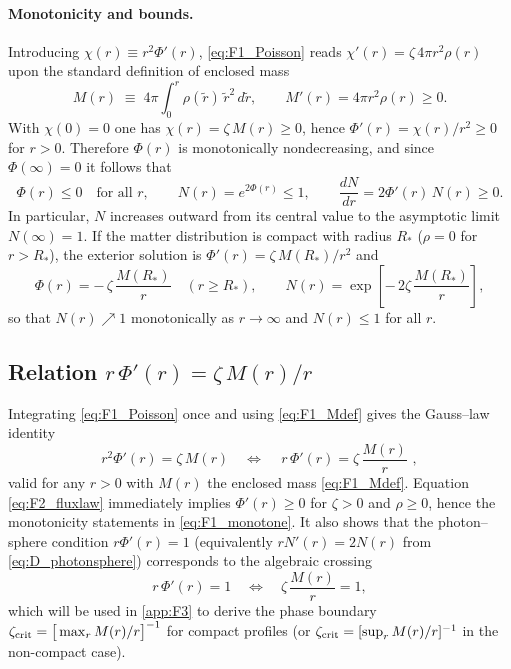 \documentclass{iopjournal}
\begin{document}
\paragraph{Monotonicity and bounds.}
Introducing $\chi(r)\equiv r^{2}\Phi'(r)$, \eqref{eq:F1_Poisson} reads $\chi'(r)=\zeta\,4\pi r^{2}\rho(r)$ upon the standard definition of enclosed mass
\begin{equation}
M(r)\;\equiv\;4\pi\!\int_{0}^{r}\!\rho(\tilde r)\,\tilde r^{2}\,d\tilde r,\qquad M'(r)=4\pi r^{2}\rho(r)\ge0.
\label{eq:F1_Mdef}
\end{equation}
With $\chi(0)=0$ one has $\chi(r)=\zeta\,M(r)\ge0$, hence $\Phi'(r)=\chi(r)/r^{2}\ge0$ for $r>0$. Therefore $\Phi(r)$ is monotonically nondecreasing, and since $\Phi(\infty)=0$ it follows that
\begin{equation}
\Phi(r)\le 0\quad\text{for all }r,\qquad
N(r)=e^{2\Phi(r)}\le 1,\qquad \frac{dN}{dr}=2\Phi'(r)\,N(r)\ge0.
\label{eq:F1_monotone}
\end{equation}
In particular, $N$ increases outward from its central value to the asymptotic limit $N(\infty)=1$. If the matter distribution is compact with radius $R_\ast$ ($\rho=0$ for $r>R_\ast$), the exterior solution is $\Phi'(r)=\zeta\,M(R_\ast)/r^{2}$ and
\begin{equation}
\Phi(r)=-\,\zeta\,\frac{M(R_\ast)}{r}\quad (r\ge R_\ast),\qquad
N(r)=\exp\!\left[-\,2\zeta\,\frac{M(R_\ast)}{r}\right],
\label{eq:F1_ext}
\end{equation}
so that $N(r)\nearrow 1$ monotonically as $r\to\infty$ and $N(r)\le1$ for all $r$.

\subsection{\texorpdfstring{Relation $r\,\Phi'(r)=\zeta\,M(r)/r$}{Relation rΦ′(r)=ζ M(r)/r}}\label{app:F2}

Integrating \eqref{eq:F1_Poisson} once and using \eqref{eq:F1_Mdef} gives the Gauss–law identity
\begin{equation}
r^{2}\Phi'(r)=\zeta\,M(r)\quad\Longleftrightarrow\quad
\boxed{\,r\,\Phi'(r)=\zeta\,\frac{M(r)}{r}\,}\,,
\label{eq:F2_fluxlaw}
\end{equation}
valid for any $r>0$ with $M(r)$ the enclosed mass \eqref{eq:F1_Mdef}. Equation \eqref{eq:F2_fluxlaw} immediately implies $\Phi'(r)\ge0$ for $\zeta>0$ and $\rho\ge0$, hence the monotonicity statements in \eqref{eq:F1_monotone}. It also shows that the photon–sphere condition $r\Phi'(r)=1$ (equivalently $rN'(r)=2N(r)$ from \eqref{eq:D_photonsphere}) corresponds to the algebraic crossing
\begin{equation}
r\,\Phi'(r)=1
\quad\Longleftrightarrow\quad
\zeta\,\frac{M(r)}{r}=1,
\label{eq:F2_crossing}
\end{equation}
which will be used in \cref{app:F3} to derive the phase boundary $\zeta_{\rm crit}=\big[\max_{r} M(r)/r\big]^{-1}$ for compact profiles (or $\zeta_{\rm crit}=[\sup_{r} M(r)/r]^{-1}$ in the non-compact case).
\end{document}

